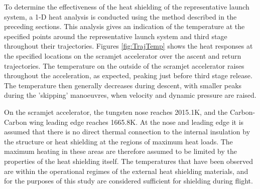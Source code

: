  
To determine the effectiveness of the heat shielding of the representative launch system, a 1-D heat analysis is conducted using the method described in the preceding sections.
This analysis gives an indication of the temperature at the specified points around the representative launch system and third stage throughout their trajectories. 
Figures \ref{fig:TrajTemp} shows the heat responses at the specified locations on the scramjet accelerator over the ascent and return trajectories. The temperature on the outside of the scramjet accelerator raises throughout the acceleration, as expected, peaking just before third stage release. The temperature then generally decreases during descent, with smaller peaks during the 'skipping' manoeuvres, when velocity and dynamic pressure are raised.

On the scramjet accelerator, the tungsten nose reaches 2015.1K, and the Carbon-Carbon wing leading edge reaches 1665.8K. 
At the nose and leading edge it is assumed that there is no direct thermal connection to the internal insulation by the structure or heat shielding at the regions of maximum heat loads. The maximum heating in these areas are therefore assumed to be limited by the properties of the heat shielding itself. The temperatures that have been observed are within the operational regimes of the external heat shielding materials, and for the purposes of this study are considered sufficient for shielding during flight.


